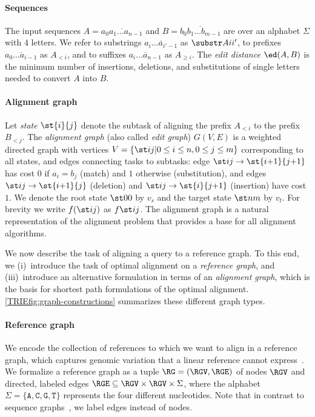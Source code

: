 \paragraph{Sequences}
The input sequences $A = \overline{a_0a_1\dots a_{n-1}}$ and $B =
\overline{b_0b_1 \dots b_{m-1}}$ are over an alphabet $\Sigma$ with $4$ letters.
We refer to substrings $\overline{a_i \dots a_{i'-1}}$ as $\substr Ai{i'}$, to
prefixes $\overline{a_0 \dots a_{i-1}}$ as $A_{<i}$, and to suffixes
$\overline{a_i \dots a_{n-1}}$ as $A_{\geq i}$. The \emph{edit distance}
$\ed(A,B)$ is the minimum number of insertions, deletions, and substitutions of
single letters needed to convert $A$ into $B$.

\paragraph{Alignment graph}
Let \emph{state} $\st{i}{j}$ denote the subtask of aligning the prefix $A_{<i}$
to the prefix $B_{<j}$. The \emph{alignment graph} (also called \emph{edit
graph}) $G(V,E)$ is a weighted directed graph with vertices $V = \{\st ij \vert
{0\leq i \leq n}, {0\leq j\leq m}\}$ corresponding to all states, and edges
connecting tasks to subtasks: edge ${\st ij \to \st{i{+}1}{j{+}1}}$ has cost $0$
if ${a_i = b_j}$ (match) and $1$ otherwise (substitution), and edges ${\st ij
\to \st{i{+}1}{j}}$ (deletion) and ${\st ij \to\st{i}{j{+}1}}$ (insertion) have
cost $1$. We denote the root state $\st 00$ by $v_s$ and the target state $\st
nm$ by $v_t$. For brevity we write $f(\st ij)$ as $f \st ij$. The alignment graph is
a natural representation of the alignment problem that provides a base for all
alignment algorithms.

\label{TRIEsec:task}

We now describe the task of aligning a query to a reference graph. To this end,
we (i)~introduce the task of optimal alignment on a \emph{reference graph}, and
(iii)~introduce an alternative formulation in terms of an \emph{alignment
graph}, which is the basis for shortest path formulations of the optimal
alignment.
%
\cref{TRIEfig:graph-constructions} summarizes these different graph types.

\paragraph{Reference graph}
We encode the collection of references to which we want to align in a reference
graph, which captures genomic variation that a linear reference cannot
express~\cite{paten_genome_2017,garrison_variation_2018}.
%
We formalize a reference graph as a tuple $\RG=(\RGV,\RGE)$ of nodes $\RGV$ and
directed, labeled edges $\RGE \subseteq \RGV \times \RGV \times \Sigma$, where
the alphabet $\Sigma=\{\texttt{A},\texttt{C},\texttt{G},\texttt{T}\}$ represents
the four different nucleotides.
%
Note that in contrast to sequence graphs~\cite{rautiainen_aligning_2017}, we
label edges instead of nodes.

